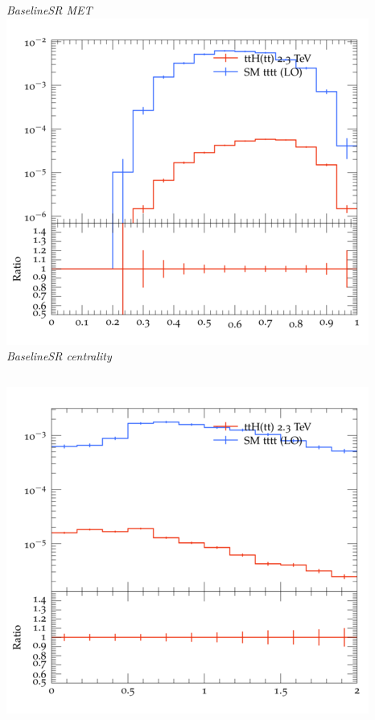 \documentclass{beamer}
\begin{document}
\begin{frame}
\begin{columns}
\textit{\small BaselineSR MET}
\includegraphics[width=\textwidth]{../plots/ttH_2300/tttt_ttH_1LOS/BaselineSR_centrality.png}\\
\textit{\small BaselineSR centrality}
\end{columns}
\begin{columns}
\includegraphics[width=\textwidth]{../plots/ttH_2300/tttt_ttH_1LOS/BaselineSR_deltaR_bl_min.png}\\

\end{columns}
\end{frame}
\end{document}
